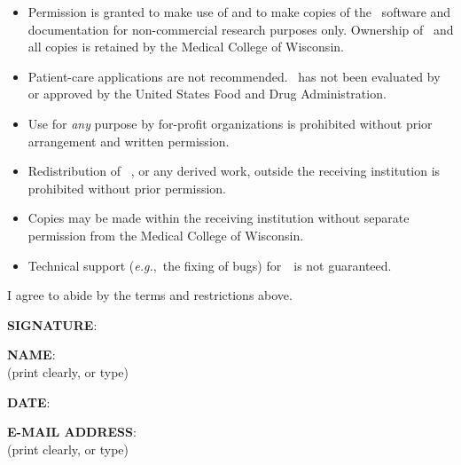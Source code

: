\begin{itemize}\vspace*{-4.9ex}\setlength{\parindent}{0em}\setlength{\parskip}{0.1ex}
   \item Permission is granted to make use of and to make copies of the
        \MCW$\!$~\afnit software and documentation for non-commercial research
        purposes only.  Ownership of \MCW$\!$~\afnit and all copies is retained by the
        Medical College of Wisconsin.

   \item Patient-care applications are not recommended.  \MCW$\!$~\afnit has not
        been evaluated by or approved by the United States Food and Drug Administration.

   \item Use for {\it any\/} purpose
         by for-profit organizations is prohibited without prior arrangement
         and written permission.

   \item Redistribution of \MCW$\!$~\afni, or any derived work, outside the receiving
        institution is prohibited without prior permission.

   \item Copies may be made within the receiving institution without separate
        permission from the Medical College of Wisconsin.

   \item Technical support ({\it e.g.},~the fixing of bugs)
                  for\ \MCW$\!$~\afnit is not guaranteed.
\end{itemize}
I agree to abide by the terms and restrictions above.\vspace{2ex}

{\bf SIGNATURE}:\vspace{2ex}


{\bf NAME}:\\
(print clearly, or type)\vspace{2ex}

{\bf DATE}:\vspace{2ex}

{\bf E-MAIL ADDRESS}:\\
(print clearly, or type)\vspace{0.5ex}

